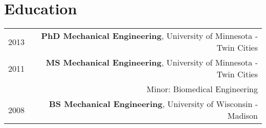 \section*{Education}
\begin{tabular}{L!{\VRule}R}
2013&\textbf{PhD Mechanical Engineering}, University of Minnesota - Twin Cities\\
2011&\textbf{MS Mechanical Engineering}, University of Minnesota - Twin Cities\\
& \hspace{5 mm} Minor: Biomedical Engineering \\
2008&\textbf{BS Mechanical Engineering}, University of Wisconsin - Madison\\
\end{tabular}